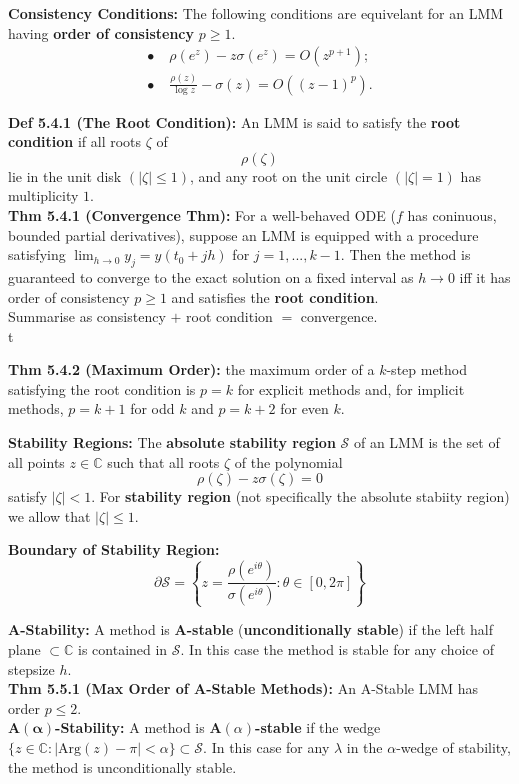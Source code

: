 \documentclass[10pt,a4paper]{article}
\newcommand{\C}{\mathbb{C}}
\newcommand{\del}{\partial}
\newcommand{\bul}{\bullet}
\begin{document}
\begin{multicols*}{2}
\textbf{Consistency Conditions:} The following conditions are equivelant for an LMM having \textbf{order of consistency} $p \geq 1$.
\begin{align*}
    \bul& \; \rho(e^z) - z\sigma(e^z) = O(z^{p + 1});\\
    \bul& \; \frac{\rho(z)}{\log z} - \sigma(z) = O((z - 1)^p).
\end{align*}


\textbf{Def 5.4.1 (The Root Condition):} An LMM is said to satisfy the \textbf{root condition} if all roots $\zeta$ of 
\[
\rho(\zeta)    
\]lie in the unit disk $(|\zeta| \leq 1)$, and any root on the unit circle $(|\zeta| = 1)$ has multiplicity $1$.\\

\textbf{Thm 5.4.1 (Convergence Thm):} For a well-behaved ODE ($f$ has coninuous, bounded partial derivatives), suppose an LMM is equipped with a procedure satisfying $\lim_{h \to 0} y_j = y(t_0 + jh)$ for $j = 1,...,k - 1$. Then the method is guaranteed
to converge to the exact solution on a fixed interval as $h \to 0$ iff it has order of consistency $p \geq 1$ and satisfies the \textbf{root condition}.\\

Summarise as consistency $+$ root condition $=$ convergence.\\t

\textbf{Thm 5.4.2 (Maximum Order):} the maximum order of a $k$-step method satisfying the root condition is $p = k$ for explicit methods and, for implicit methods, $p = k + 1$ for odd $k$ and $p = k + 2$ for even $k$.

\textbf{Stability Regions:} The \textbf{absolute stability region} $\mathcal S$ of an LMM is the set of all points $z \in \C$ such that all roots $\zeta$ of the polynomial
\[
\rho(\zeta) - z\sigma(\zeta) = 0    
\]
satisfy $|\zeta| < 1$. For \textbf{stability region} (not specifically the absolute stabiity region) we allow that $|\zeta |\leq 1$.

\textbf{Boundary of Stability Region:}
\[
\del \mathcal S = \left\{z = \frac{\rho(e^{i\theta})}{\sigma(e^{i\theta})} : \theta \in [0,2\pi]\right\}    
\]

\textbf{A-Stability:} A method is \textbf{A-stable} (\textbf{unconditionally stable}) if the left half plane $\subset \C$ is contained in $\mathcal S$. In this case the method is stable for any choice of stepsize $h$.\\

\textbf{Thm 5.5.1 (Max Order of A-Stable Methods):} An A-Stable LMM has order $p \leq 2$.\\

\textbf{A$(\mathbf \alpha)$-Stability:} A method is \textbf{A$(\alpha)$-stable} if the wedge $\{z \in \C : |\text{Arg}(z) - \pi| < \alpha \} \subset \mathcal S$. In this case for any $\lambda$ in the $\alpha$-wedge of stability, the method is unconditionally stable.


\end{multicols*}
\end{document}

